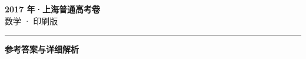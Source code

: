 \documentclass[zihao=5, a4paper]{ctexart}
\begin{document}
\begin{center}
  {\Large\bfseries 2017 年·上海普通高考卷}\\[4pt]
  {\large 数学 · 印刷版}
\end{center}
\medskip
{}

\par\bigskip\hrule\bigskip
{}
\begin{center}{\large\bfseries 参考答案与详细解析}\end{center}
\smallskip

\end{document}
